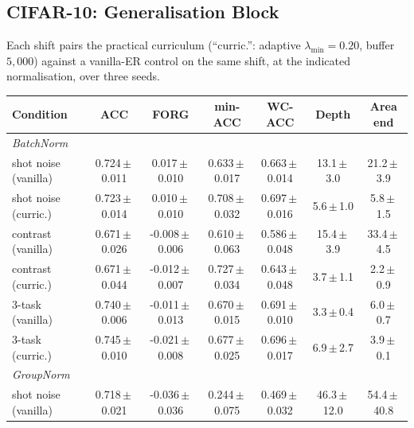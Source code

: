 \subsection{CIFAR-10: Generalisation Block}
\label{app:cifar_gen_full}

Each shift pairs the practical curriculum (``curric.'': adaptive $\lambda_{\min} = 0.20$, buffer $5{,}000$) against a vanilla-ER control on the same shift, at the indicated normalisation, over three seeds.

\begin{table}[H]
    \centering
    \scriptsize
    \setlength{\tabcolsep}{4pt}
    \begin{tabular}{l ccc c cc}
        \hline
        Condition            & ACC                 & FORG                 & min-ACC             & WC-ACC              & Depth             & Area end          \\
        \hline
        \multicolumn{7}{l}{\emph{BatchNorm}}                                                                                                                  \\
        shot noise (vanilla) & 0.724\,$\pm$\,0.011 & 0.017\,$\pm$\,0.010  & 0.633\,$\pm$\,0.017 & 0.663\,$\pm$\,0.014 & 13.1\,$\pm$\,3.0  & 21.2\,$\pm$\,3.9  \\
        shot noise (curric.) & 0.723\,$\pm$\,0.014 & 0.010\,$\pm$\,0.010  & 0.708\,$\pm$\,0.032 & 0.697\,$\pm$\,0.016 & 5.6\,$\pm$\,1.0   & 5.8\,$\pm$\,1.5   \\
        contrast (vanilla)   & 0.671\,$\pm$\,0.026 & -0.008\,$\pm$\,0.006 & 0.610\,$\pm$\,0.063 & 0.586\,$\pm$\,0.048 & 15.4\,$\pm$\,3.9  & 33.4\,$\pm$\,4.5  \\
        contrast (curric.)   & 0.671\,$\pm$\,0.044 & -0.012\,$\pm$\,0.007 & 0.727\,$\pm$\,0.034 & 0.643\,$\pm$\,0.048 & 3.7\,$\pm$\,1.1   & 2.2\,$\pm$\,0.9   \\
        3-task (vanilla)     & 0.740\,$\pm$\,0.006 & -0.011\,$\pm$\,0.013 & 0.670\,$\pm$\,0.015 & 0.691\,$\pm$\,0.010 & 3.3\,$\pm$\,0.4   & 6.0\,$\pm$\,0.7   \\
        3-task (curric.)     & 0.745\,$\pm$\,0.010 & -0.021\,$\pm$\,0.008 & 0.677\,$\pm$\,0.025 & 0.696\,$\pm$\,0.017 & 6.9\,$\pm$\,2.7   & 3.9\,$\pm$\,0.1   \\
        \hline
        \multicolumn{7}{l}{\emph{GroupNorm}}                                                                                                                  \\
        shot noise (vanilla) & 0.718\,$\pm$\,0.021 & -0.036\,$\pm$\,0.036 & 0.244\,$\pm$\,0.075 & 0.469\,$\pm$\,0.032 & 46.3\,$\pm$\,12.0 & 54.4\,$\pm$\,40.8 \\

\end{tabular}
\end{table}
